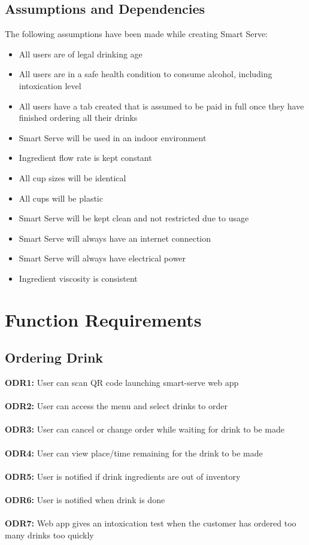 \documentclass{article}
\begin{document}
\subsection{Assumptions and Dependencies} %
    The following assumptions have been made while creating Smart Serve:
    \begin{itemize}
        \item All users are of legal drinking age
        \item All users are in a safe health condition to consume alcohol, including intoxication level
        \item All users have a tab created that is assumed to be paid in full once they have finished ordering all their drinks
        \item Smart Serve will be used in an indoor environment
        \item Ingredient flow rate is kept constant
        \item All cup sizes will be identical
        \item All cups will be plastic
        \item Smart Serve will be kept clean and not restricted due to usage
        \item Smart Serve will always have an internet connection
        \item Smart Serve will always have electrical power
        \item Ingredient viscosity is consistent
    \end{itemize}

\section{Function Requirements}
\subsection{Ordering Drink}
    \noindent\textbf{ODR1:} User can scan QR code launching smart-serve web app \\\\ 
    \textbf{ODR2:} User can access the menu and select drinks to order\\\\ 
    \textbf{ODR3:} User can cancel or change order while waiting for drink to be made \\\\ 
    \textbf{ODR4:} User can view place/time remaining for the drink to be made \\\\ 
    \textbf{ODR5:} User is notified if drink ingredients are out of inventory\\\\ 
    \textbf{ODR6:} User is notified when drink is done\\\\
    \textbf{ODR7:} Web app gives an intoxication test when the customer has ordered too many drinks too quickly\\
\end{document}

